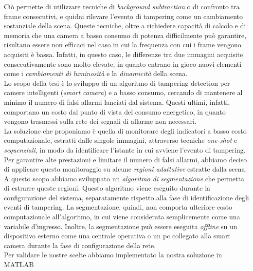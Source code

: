 Ci\`o permette di utilizzare tecniche di \textit{background subtraction} o di confronto tra frame consecutivi, e quidni rilevare l'evento di tampering come un cambiamento sostanziale della scena.
Queste tecniche, oltre a richiedere capacit\`a di calcolo e di memoria che una camera a basso consumo di potenza difficilmente pu\`o garantire, risultano essere non efficaci nel caso in cui la frequenza con cui i frame vengono acquisiti \`e bassa.
Infatti, in questo caso, le differenze tra due immagini acquisite consecutivamente sono molto elevate, in quanto entrano in gioco nuovi elementi come i \textit{cambiamenti di luminosit\`a} e la \textit{dinamicit\`a} della scena.\\
Lo scopo della tesi \`e lo sviluppo di un algoritmo di tampering detection per camere intelligenti (\textit{smart camera}) e a basso consumo, cercando di mantenere al minimo il numero di falsi allarmi lanciati dal sistema.
Questi ultimi, infatti, comportano un costo dal punto di vista del consumo energetico, in quanto vengono trasmessi sulla rete dei segnali di allarme non necessari.\\
La soluzione che proponiamo \`e quella di monitorare degli indicatori a basso costo computazionale, estratti dalle singole immagini, attraverso tecniche \textit{one-shot} e \textit{sequenziali}, in modo da identificare l'istante in cui avviene l'evento di tampering.\\
Per garantire alte prestazioni e limitare il numero di falsi allarmi, abbiamo deciso di applicare questo monitoraggio su alcune \textit{regioni adattative} estratte dalla scena.
A questo scopo abbiamo sviluppato un \textit{algoritmo di segmentazione} che permetta di estrarre queste regioni.
Questo algoritmo viene eseguito durante la configurazione del sistema, separatamente rispetto alla fase di identificazione degli eventi di tampering.
La segmentazione, quindi, non comporta ulteriore costo computazionale all'algoritmo, in cui viene considerata semplicemente come una variabile d'ingresso.
Inoltre, la segmentazione pu\`o essere eseguita \textit{offline} su un dispositivo esterno come una centrale operativa o un pc collegato alla smart camera durante la fase di configurazione della rete.\\
Per validare le nostre scelte abbiamo implementato la nostra soluzione in MATLAB %
